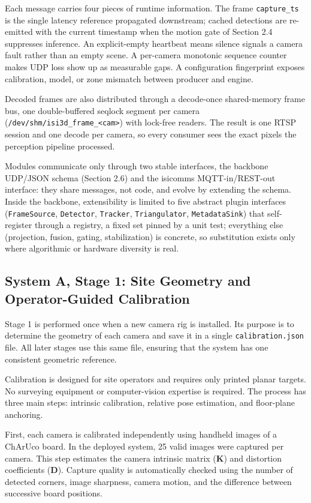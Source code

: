 \documentclass[9pt,a4paper,twocolumn]{rho-class/rho}
\begin{document}
Each message carries four pieces of runtime information. The frame \texttt{capture\_ts} is the single latency reference propagated downstream; cached detections are re-emitted with the current timestamp when the motion gate of Section 2.4 suppresses inference. An explicit-empty heartbeat means silence signals a camera fault rather than an empty scene. A per-camera monotonic sequence counter makes UDP loss show up as measurable gaps. A configuration fingerprint exposes calibration, model, or zone mismatch between producer and engine.

Decoded frames are also distributed through a decode-once shared-memory frame bus, one double-buffered seqlock segment per camera (\texttt{/dev/shm/isi3d\_frame\_<cam>}) with lock-free readers. The result is one RTSP session and one decode per camera, so every consumer sees the exact pixels the perception pipeline processed.

Modules communicate only through two stable interfaces, the backbone UDP/JSON schema (Section 2.6) and the isicomms MQTT-in/REST-out interface: they share messages, not code, and evolve by extending the schema. Inside the backbone, extensibility is limited to five abstract plugin interfaces (\texttt{FrameSource}, \texttt{Detector}, \texttt{Tracker}, \texttt{Triangulator}, \texttt{MetadataSink}) that self-register through a registry, a fixed set pinned by a unit test; everything else (projection, fusion, gating, stabilization) is concrete, so substitution exists only where algorithmic or hardware diversity is real.

\subsection{System A, Stage 1: Site Geometry and Operator-Guided Calibration}

Stage 1 is performed once when a new camera rig is installed. Its purpose is to determine the geometry of each camera and save it in a single \texttt{calibration.json} file. All later stages use this same file, ensuring that the system has one consistent geometric reference.

Calibration is designed for site operators and requires only printed planar targets. No surveying equipment or computer-vision expertise is required. The process has three main steps: intrinsic calibration, relative pose estimation, and floor-plane anchoring.

First, each camera is calibrated independently using handheld images of a ChArUco board. In the deployed system, 25 valid images were captured per camera. This step estimates the camera intrinsic matrix ($\mathbf{K}$) and distortion coefficients ($\mathbf{D}$). Capture quality is automatically checked using the number of detected corners, image sharpness, camera motion, and the difference between successive board positions.
\end{document}
